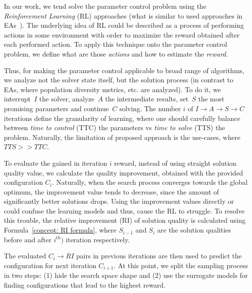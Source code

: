 In our work, we tend solve the parameter control problem using the \emph{Reinforcement Learning} (RL) approaches (what is similar to used approaches in EAs~\cite{karafotias2014generic}). %
The underlying idea of RL could be described as a process of performing actions in some environment with order to maximize the reward obtained after each performed action. To apply this technique onto the parameter control problem, we define what are those \emph{actions} and how to estimate the \emph{reward}. 

Thus, for making the parameter control applicable to broad range of algorithms, we analyze not the solver state itself, but the solution process (in contrast to EAs, where population diversity metrics, etc. are analyzed). To do it, we interrupt~$I$ the solver, analyze~$A$ the intermediate results, set~$S$ the most promising parameters and continue~$C$ solving. The number $i$ of $I \rightarrow A \rightarrow S \rightarrow C$ iterations define the granularity of learning, where one should carefully balance between \emph{time to control} (TTC) the parameters vs \emph{time to solve} (TTS) the problem. Naturally, the limitation of proposed approach is the use-cases, where $TTS >> TTC$.


To evaluate the gained in iteration $i$ reward, instead of using straight solution quality value, we calculate the quality improvement, obtained with the provided configuration $C_i$. Naturally, when the search process converges towards the global optimum, the improvement value tends to decrease, since the amount of significantly better solutions drops. Using the improvement values directly or could confuse the learning models and thus, cause the RL to struggle. To resolve this trouble, the relative improvement (RI) of solution quality is calculated using Formula~\ref{concept: RI formula}, where $S_{i-1}$ and $S_i$ are the solution qualities before and after $i^{th})$ iteration respectively.

The evaluated $C_i \rightarrow RI$ pairs in previous iterations are then used to predict the configuration for next iteration $C_{i+1}$. At this point, we split the sampling process in two steps: (1) hide the search space shape and (2) use the surrogate models for finding configurations that lead to the highest reward.




